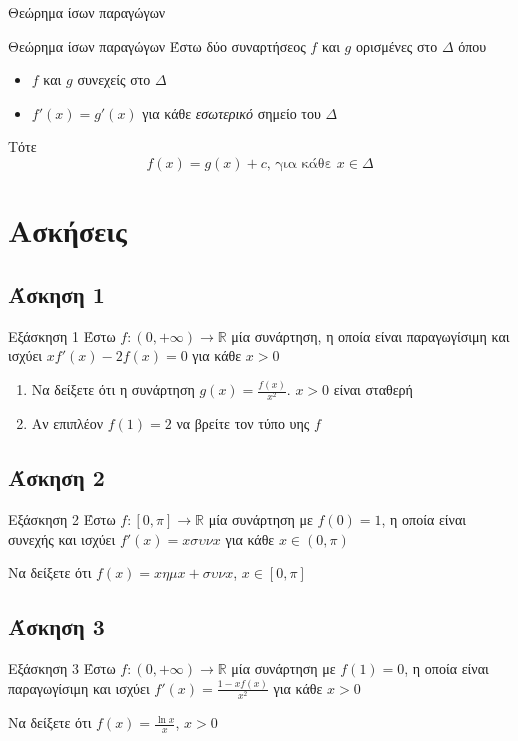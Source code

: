 \documentclass[greek]{beamer}
\begin{document}
\begin{frame}{Θεώρημα ίσων παραγώγων}
 \begin{block}{Θεώρημα ίσων παραγώγων}
  Έστω δύο συναρτήσεος $f$ και $g$ ορισμένες στο $Δ$ όπου
  \begin{itemize}
   \item $f$ και $g$ συνεχείς στο $Δ$
   \item $f'(x)=g'(x)$ για κάθε \emph{εσωτερικό} σημείο του $Δ$
  \end{itemize}
  Τότε
  $$f(x)=g(x)+c \text{, για κάθε } x\in Δ$$
 \end{block}
\end{frame}

\section{Ασκήσεις}
\subsection{Άσκηση 1}
\begin{frame}[label=Άσκηση1]{Εξάσκηση 1}
 Έστω $f:(0,+\infty)\to\mathbb{R}$ μία συνάρτηση, η οποία είναι παραγωγίσιμη και ισχύει $xf'(x)-2f(x)=0$ για κάθε $x>0$
 \begin{enumerate}
   \item<1-> Να δείξετε ότι η συνάρτηση $g(x)=\frac{f(x)}{x^2}$. $x>0$ είναι σταθερή
   \item<2-> Αν επιπλέον $f(1)=2$ να βρείτε τον τύπο υης $f$
 \end{enumerate}

\end{frame}

\subsection{Άσκηση 2}
\begin{frame}[label=Άσκηση2]{Εξάσκηση 2}
 Έστω $f:[0,π]\to\mathbb{R}$ μία συνάρτηση με $f(0)=1$, η οποία είναι συνεχής και ισχύει $f'(x)=xσυνx$ για κάθε $x\in (0,π)$

 Να δείξετε ότι $f(x)=xημx+συνx$, $x\in [0,π]$

\end{frame}

\subsection{Άσκηση 3}
\begin{frame}[label=Άσκηση3]{Εξάσκηση 3}
 Έστω $f:(0,+\infty)\to\mathbb{R}$ μία συνάρτηση με $f(1)=0$, η οποία είναι παραγωγίσιμη και ισχύει $f'(x)=\frac{1-xf(x)}{x^2}$ για κάθε $x>0$

 Να δείξετε ότι $f(x)=\frac{\ln x}{x}$, $x>0$

\end{frame}
\end{document}
